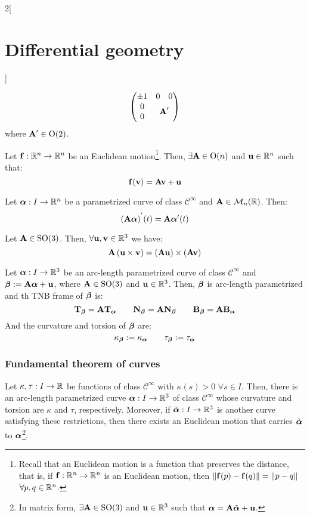 \documentclass[../../../main.tex]{subfiles}
\begin{document}
\begin{multicols}{2}[\section{Differential geometry}]
\begin{proposition}
$$\begin{pmatrix}
        \pm 1 & 0                                              & 0 \\
        0     & \multicolumn{2}{c}{\multirow{2}{*}{$\vf{A}'$}}     \\
        0     &                                                &
      \end{pmatrix}$$
    where $\vf{A}'\in\text{O}(2)$.
  \end{proposition}
  \begin{proposition}
    Let $\vf{f}:\RR^n\rightarrow\RR^n$ be an Euclidean motion\footnote{Recall that an Euclidean motion is a function that preserves the distance, that is, if $\vf{f}:\RR^n\rightarrow\RR^n$ is an Euclidean motion, then $\|\vf{f}(p)-\vf{f}(q)\|=\|p-q\|$ $\forall p,q\in\RR^n$.}. Then, $\exists\vf{A}\in\text{O}(n)$ and $\vf{u}\in\RR^n$ such that: $$\vf{f}(\vf{v})=\vf{Av}+\vf{u}$$
  \end{proposition}
  \begin{proposition}
    Let $\vf{\alpha}:I\rightarrow\RR^n$ be a parametrized curve of class $\mathcal{C}^\infty$ and $\vf{A}\in\mathcal{M}_n(\RR)$. Then:
    $${\left(\vf{A}\vf{\alpha}\right)}^{'}(t)=\vf{A}\vf{\alpha}'(t)$$
  \end{proposition}
  \begin{proposition}
    Let $\vf{A}\in\text{SO}(3)$. Then, $\forall \vf{u},\vf{v}\in\RR^3$ we have: $$\vf{A}\left(\vf{u}\times\vf{v}\right)=\left(\vf{Au}\right)\times\left(\vf{Av}\right)$$
  \end{proposition}
  \begin{corollary}
    Let $\vf{\alpha}:I\rightarrow\RR^3$ be an arc-length parametrized curve of class $\mathcal{C}^\infty$ and $\vf{\beta}:=\vf{A\alpha}+\vf{u}$, where $\vf{A}\in\text{SO}(3)$ and $\vf{u}\in\RR^3$. Then, $\vf{\beta}$ is arc-length parametrized and th TNB frame of $\vf{\beta}$ is:
    $$\T\beta=\vf{A}\T\alpha\qquad\N\beta=\vf{A}\N\beta\qquad\B\beta=\vf{A}\B\alpha$$
    And the curvature and torsion of $\vf\beta$ are: $$\ka\beta:=\ka\alpha\qquad\ta\beta:=\ta\alpha$$
  \end{corollary}
  \subsubsection{Fundamental theorem of curves}
  \begin{theorem}
    Let $\kappa,\tau:I\rightarrow\RR$ be functions of class $\mathcal{C}^\infty$ with $\kappa(s)>0$ $\forall s\in I$. Then, there is an arc-length parametrized curve $\vf{\alpha}:I\rightarrow\RR^3$ of class $\mathcal{C}^\infty$ whose curvature and torsion are $\kappa$ and $\tau$, respectively. Moreover, if $\tilde{\vf{\alpha}}:I\rightarrow\RR^3$ is another curve satisfying these restrictions, then there exists an Euclidean motion that carries $\tilde{\vf{\alpha}}$ to $\vf{\alpha}$\footnote{In matrix form, $\exists\vf{A}\in\text{SO}(3)$ and $\vf{u}\in\RR^3$ such that $\vf{\alpha}=\vf{A}\tilde{\vf{\alpha}}+\vf{u}$.}.
  \end{theorem}

\end{multicols}
\end{document}
